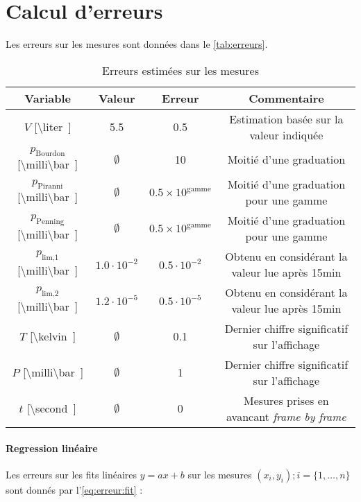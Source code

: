 \section{Calcul d'erreurs}

Les erreurs sur les mesures sont données dans le \autoref{tab:erreurs}.

\begin{table}[h]
    \centering
    \begin{tabulary}{\textwidth}{C C C C}
        \toprule
        Variable & Valeur & Erreur & Commentaire \\
        \midrule
        \(V\) [\SI{\liter}] & 5.5 & 0.5 & Estimation basée sur la valeur indiquée \\
        \(p_\textrm{Bourdon}\) [\SI{\milli\bar}] & \(\emptyset\) & 10 & Moitié d'une graduation \\
        \(p_\textrm{Piranni}\) [\SI{\milli\bar}] & \(\emptyset\) & \(0.5 \times 10^\textrm{gamme}\) & Moitié d'une graduation pour une gamme \\
        \(p_\textrm{Penning}\) [\SI{\milli\bar}] & \(\emptyset\) & \(0.5 \times 10^\textrm{gamme}\) & Moitié d'une graduation pour une gamme \\
        \(p_\textrm{lim,1}\) [\SI{\milli\bar}] & \(1.0 \cdot 10^{-2}\) & \(0.5 \cdot 10^{-2}\) & Obtenu en considérant la valeur lue après 15min \\
        \(p_\textrm{lim,2}\) [\SI{\milli\bar}] & \(1.2 \cdot 10^{-5}\) & \(0.5 \cdot 10^{-5}\) & Obtenu en considérant la valeur lue après 15min \\
        \midrule
        \(T\) [\SI{\kelvin}] & \(\emptyset\) & 0.1 & Dernier chiffre significatif sur l'affichage \\
        \(P\) [\SI{\milli\bar}] & \(\emptyset\) & 1 & Dernier chiffre significatif sur l'affichage \\
        \(t\) [\SI{\second}] & \(\emptyset\) & 0 & Mesures prises en avancant \textit{frame by frame} \\
        \bottomrule
    \end{tabulary}
    \caption{Erreurs estimées sur les mesures}
    \label{tab:erreurs}
\end{table}

\paragraph*{Regression linéaire}
Les erreurs sur les fits linéaires \(y = ax + b\) sur les mesures \((x_i, y_i) ; i = \{1, \hdots, n\}\) sont donnés par l'\autoref{eq:erreur:fit} \cite{erreursmesure}:

